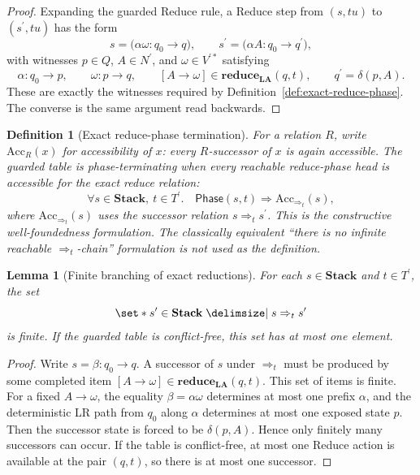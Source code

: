 \documentclass[11pt,a4paper]{article}
\theoremstyle{prettyplain}
\newtheorem{lemma}[theorem]{Lemma}
\theoremstyle{prettydef}
\newtheorem{definition}[theorem]{Definition}
\def\mid{\;\delimsize\vert\;}#1%
\newcommand{\Path}[3]{#1:#2\to#3}
\newcommand{\Item}[2]{[#1\to #2]}
\newcommand{\Look}{\mathbf{LA}}
\newcommand{\Reduce}{\mathbf{reduce}}
\begin{document}
\begin{proof}
Expanding the guarded Reduce rule, a Reduce step from \((s,t u)\) to
\((s^\prime,t u)\) has the form
\[
s=\bigl(\Path{\alpha\omega}{q_0}{q}\bigr),
\qquad
s^\prime=\bigl(\Path{\alpha A}{q_0}{q^\prime}\bigr),
\]
with witnesses \(p\in Q\), \(A\in N^\prime\), and
\(\omega\in V^{\prime *}\) satisfying
\[
\Path{\alpha}{q_0}{p},
\qquad
\Path{\omega}{p}{q},
\qquad
\Item{A}{\omega}\in\Reduce_{\Look}(q,t),
\qquad
q^\prime=\delta(p,A).
\]
These are exactly the witnesses required by
Definition~\ref{def:exact-reduce-phase}.  The converse is the same argument read
backwards.
\end{proof}

\begin{definition}[Exact reduce-phase termination]\label{def:exact-phase-termination}
For a relation \(R\), write \(\mathrm{Acc}_R(x)\) for accessibility of \(x\): every
\(R\)-successor of \(x\) is again accessible.  The guarded table is
\emph{phase-terminating} when every reachable reduce-phase head is accessible for
the exact reduce relation:
\[
\forall s\in\mathbf{Stack},\ t\in T^\prime.\quad
\mathsf{Phase}(s,t)
\Longrightarrow
\mathrm{Acc}_{\Rightarrow_t}(s),
\]
where \(\mathrm{Acc}_{\Rightarrow_t}(s)\) uses the successor relation
\(s\Rightarrow_t s^\prime\).  This is the constructive well-foundedness
formulation.  The classically equivalent ``there is no infinite reachable
\(\Rightarrow_t\)-chain'' formulation is not used as the definition.
\end{definition}

\begin{lemma}[Finite branching of exact reductions]\label{lem:exact-reduce-finite-branching}
For each \(s\in\mathbf{Stack}\) and \(t\in T^\prime\), the set
\[
\set*{s^\prime\in\mathbf{Stack}\mid s\Rightarrow_t s^\prime}
\]
is finite.  If the guarded table is conflict-free, this set has at most one
element.
\end{lemma}

\begin{proof}
Write \(s=\Path{\beta}{q_0}{q}\).  A successor of \(s\) under
\(\Rightarrow_t\) must be produced by some completed item
\(\Item{A}{\omega}\in\Reduce_{\Look}(q,t)\).  This set of items is finite.  For a
fixed \(A\to\omega\), the equality \(\beta=\alpha\omega\) determines at most one
prefix \(\alpha\), and the deterministic LR path from \(q_0\) along \(\alpha\)
determines at most one exposed state \(p\).  Then the successor state is forced
to be \(\delta(p,A)\).  Hence only finitely many successors can occur.  If the
table is conflict-free, at most one Reduce action is available at the pair
\((q,t)\), so there is at most one successor.
\end{proof}
\end{document}
